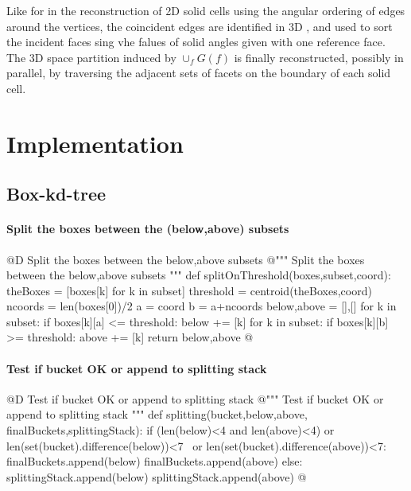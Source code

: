 \documentclass[11pt,oneside]{article}    %
\begin{document}
Like for in the reconstruction of 2D solid cells using the angular ordering of edges around the vertices, the coincident edges are identified in 3D , and used to sort the incident faces sing vhe falues of solid angles given with one reference face.
The 3D space partition induced by $\cup_f G(f)$ is finally reconstructed, possibly in parallel, by traversing the adjacent sets of facets on the boundary of each solid cell.



\section{Implementation}

\subsection{Box-kd-tree}


\paragraph{Split the boxes between the (below,above) subsets}
@D Split the boxes between the below,above subsets
@{""" Split the boxes between the below,above subsets """
def splitOnThreshold(boxes,subset,coord):
    theBoxes = [boxes[k] for k in subset]
    threshold = centroid(theBoxes,coord)
    ncoords = len(boxes[0])/2
    a = coord%
    b = a+ncoords
    below,above = [],[]
    for k in subset:
        if boxes[k][a] <= threshold: below += [k]
    for k in subset:
        if boxes[k][b] >= threshold: above += [k]
    return below,above
@}

\paragraph{Test if bucket OK or append to splitting stack}
@D Test if bucket OK or append to splitting stack
@{""" Test if bucket OK or append to splitting stack """
def splitting(bucket,below,above, finalBuckets,splittingStack):
    if (len(below)<4 and len(above)<4) or len(set(bucket).difference(below))<7 \
        or len(set(bucket).difference(above))<7: 
        finalBuckets.append(below)
        finalBuckets.append(above)
    else: 
        splittingStack.append(below)
        splittingStack.append(above)
@}
\end{document}
